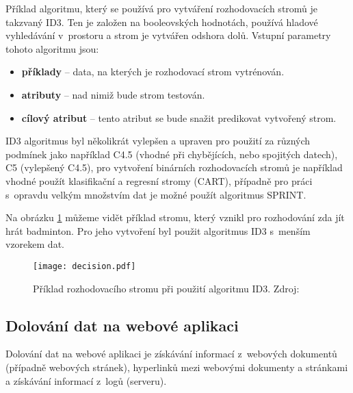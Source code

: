 \par Příklad algoritmu, který se používá pro vytváření rozhodovacích stromů je takzvaný ID3. Ten je založen na booleovských hodnotách, používá hladové vyhledávání v~prostoru a strom je vytvářen odshora dolů. Vstupní parametry tohoto algoritmu jsou:
\begin{itemize}
\item \textbf{příklady} -- data, na kterých je rozhodovací strom vytrénován.
\item \textbf{atributy} -- nad nimiž bude strom testován.
\item  \textbf{cílový atribut} -- tento atribut se bude snažit predikovat vytvořený strom. \cite{minigbook}
\end{itemize}
ID3 algoritmus byl několikrát vylepšen a upraven pro použití za různých podmínek jako například C4.5 (vhodné při chybějících, nebo spojitých datech), C5 (vylepšený C4.5), pro vytvoření binárních rozhodovacích stromů je například vhodné použít klasifikační a regresní stromy (CART), případně pro práci s~opravdu velkým množstvím dat je možné použít algoritmus SPRINT. \cite{minigbook}

\par Na obrázku \ref{decision-tree} můžeme vidět příklad stromu, který vznikl pro rozhodování zda jít hrát badminton. Pro jeho vytvoření byl použit algoritmus ID3 s~menším vzorekem dat.
\begin{figure}[htp]
\centering
\texttt{[image: decision.pdf]}
\caption[Příklad rozhodovacího stromu při použití algoritmu ID3]{Příklad rozhodovacího stromu při použití algoritmu ID3. Zdroj: \cite{minigbook}}
\label{decision-tree}
\end{figure}

\subsection{Dolování dat na webové aplikaci}
\par Dolování dat na webové aplikaci je získávání informací z~webových dokumentů (případně webových stránek), hyperlinků mezi webovými dokumenty a stránkami a získávání informací z~logů (serveru).

